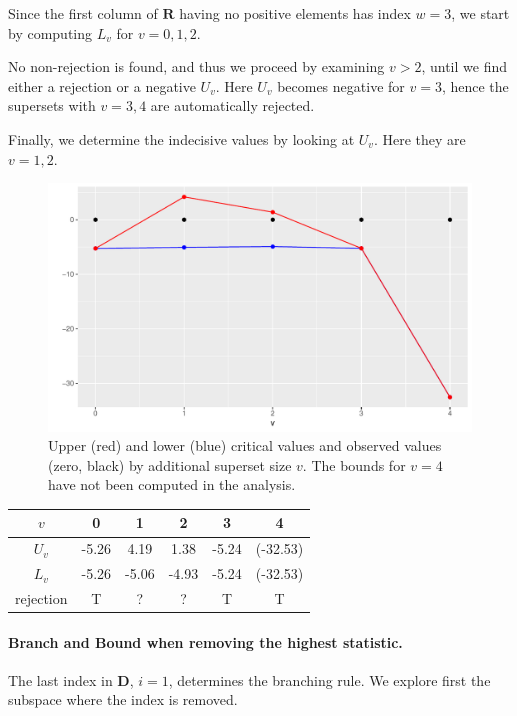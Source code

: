 \documentclass[11pt,a4paper,openright,twoside]{article}
\begin{document}
Since the first column of $\mathbf{R}$ having no positive elements has index $w=3$, we start by computing $L_v$ for $v=0,1,2$.

No non-rejection is found, and thus we proceed by examining $v>2$, until we find either a rejection or a negative $U_v$. Here $U_v$ becomes negative for $v=3$, hence the supersets with $v=3,4$ are automatically rejected.

Finally, we determine the indecisive values by looking at $U_v$. Here they are $v=1,2$.

\begin{figure}[h!]
\centering
\includegraphics[scale=0.6]{plot1.pdf}
\caption{Upper (red) and lower (blue) critical values and observed values (zero, black) by additional superset size $v$. The bounds for $v=4$ have not been computed in the analysis.}
\end{figure}


\begin{table}[h!]
\centering
\begin{tabular}{cccccc}
\toprule
$v$ & 0 & 1 & 2 & 3 & 4\\
\midrule
$U_v$ & -5.26 & 4.19 & 1.38 & -5.24 & (-32.53)\\
$L_v$ & -5.26 & -5.06 & -4.93 & -5.24 & (-32.53)\\
\midrule
rejection & T & ? & ? & T & T\\
\bottomrule
\end{tabular}
\end{table}


\newpage

\vspace{5mm}
\paragraph{Branch and Bound when removing the highest statistic.}
The last index in $\mathbf{D}$, $i=1$, determines the branching rule. We explore first the subspace where the index is removed.
\end{document}
